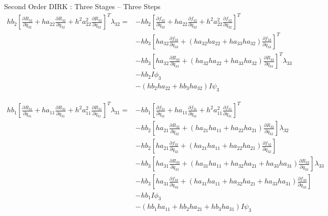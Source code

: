 \documentclass{beamer}
\newcommand{\pd}[2]{\frac{\partial #1}{\partial #2}}
\begin{document}
\begin{frame}[allowframebreaks]{Second Order DIRK : Three Stages -- Three Steps}
\begin{equation}
  \begin{split}
    hb_2\left[\pd{R_{32}}{\ddot{q}_{32}} + ha_{22}\pd{R_{32}}{\dot{q}_{32}} + h^2a_{22}^2 \pd{R_{32}}{{q}_{32}} \right]^T \lambda_{32} = & - hb_2 \left[\pd{f_{32}}{\ddot{q}_{32}} + ha_{22}\pd{f_{32}}{\dot{q}_{32}} + h^2a_{22}^2 \pd{f_{32}}{{q}_{32}} \right]^T \\ 
    & - hb_3 \left[ha_{32}\pd{f_{33}}{\dot{q}_{33}} + (ha_{32}ha_{22} + ha_{33}ha_{32}) \pd{f_{33}}{{q}_{33}} \right]^T \\  
    & - hb_3 \left[ha_{32}\pd{R_{33}}{\dot{q}_{33}} + (ha_{32}ha_{22} + ha_{33}ha_{32}) \pd{R_{33}}{{q}_{33}} \right]^T\lambda_{33} \\  
    & - hb_2 I \phi_3 \\ 
    & - (hb_2ha_{22} + hb_3 ha_{32}) I  \psi_3
  \end{split}
\end{equation}

\begin{equation}
  \begin{split}
    hb_1\left[\pd{R_{31}}{\ddot{q}_{31}} + ha_{11}\pd{R_{31}}{\dot{q}_{31}} + h^2a_{11}^2 \pd{R_{31}}{{q}_{31}} \right]^T \lambda_{31} = & - hb_1 \left[\pd{f_{31}}{\ddot{q}_{31}} + ha_{11}\pd{f_{31}}{\dot{q}_{31}} + h^2a_{11}^2 \pd{f_{31}}{{q}_{31}} \right]^T \\ 
    & - hb_2 \left[ ha_{21} \pd{R_{32}}{\dot{q}_{32}} + (ha_{21}ha_{11} + ha_{22}ha_{21}) \pd{R_{32}}{{q}_{32}} \right]\lambda_{32} \\
    & - hb_2 \left[ ha_{21} \pd{f_{32}}{\dot{q}_{32}} + (ha_{21}ha_{11} + ha_{22}ha_{21}) \pd{f_{32}}{{q}_{32}} \right] \\
    & - hb_3 \left[ ha_{31} \pd{R_{33}}{\dot{q}_{33}} + (ha_{31}ha_{11} + ha_{32}ha_{21} + ha_{33}ha_{31}) \pd{R_{33}}{{q}_{33}} \right] \lambda_{33} \\
    & - hb_3 \left[ ha_{31} \pd{f_{33}}{\dot{q}_{33}} + (ha_{31}ha_{11} + ha_{32}ha_{21} + ha_{33}ha_{31}) \pd{f_{33}}{{q}_{33}} \right] \\
    & - hb_1I \phi_3 \\ 
    & - (hb_1ha_{11} + hb_2ha_{21}+ hb_3ha_{31}) I \psi_3
  \end{split}
\end{equation}

\framebreak


\end{frame}
\end{document}
